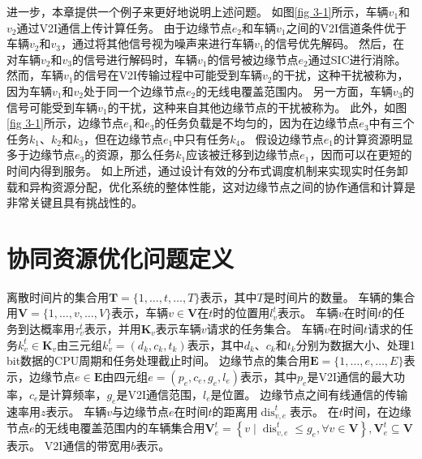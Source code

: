 进一步，本章提供一个例子来更好地说明上述问题。
如图\ref{fig 3-1}所示，车辆$v_1$和$v_2$通过V2I通信上传计算任务。
由于边缘节点$e_2$和车辆$v_1$之间的V2I信道条件优于车辆$v_2$和$v_3$，通过将其他信号视为噪声来进行车辆$v_1$的信号优先解码。
然后，在对车辆$v_2$和$v_3$的信号进行解码时，车辆$v_1$的信号被边缘节点$e_2$通过SIC进行消除。
然而，车辆$v_1$的信号在V2I传输过程中可能受到车辆$v_2$的干扰，这种干扰被称为，因为车辆$v_1$和$v_2$处于同一个边缘节点$e_2$的无线电覆盖范围内。
另一方面，车辆$v_3$的信号可能受到车辆$v_1$的干扰，这种来自其他边缘节点的干扰被称为。
此外，如图\ref{fig 3-1}所示，边缘节点$e_1$和$e_3$的任务负载是不均匀的，因为在边缘节点$e_3$中有三个任务$k_1$、$k_2$和$k_3$，但在边缘节点$e_1$中只有任务$k_4$。
假设边缘节点$e_1$的计算资源明显多于边缘节点$e_3$的资源，那么任务$k_1$应该被迁移到边缘节点$e_1$，因而可以在更短的时间内得到服务。
如上所述，通过设计有效的分布式调度机制来实现实时任务卸载和异构资源分配，优化系统的整体性能，这对边缘节点之间的协作通信和计算是非常关键且具有挑战性的。

\section[\hspace{-2pt}协同资源优化问题定义]{{ \hspace{-8pt}协同资源优化问题定义}}\label{section 3-3}

离散时间片的集合用$\mathbf{T}=\{1, \ldots, t, \ldots, T\}$表示，其中$T$是时间片的数量。
车辆的集合用$\mathbf{V}=\{1, \ldots, v, \ldots, V\}$表示，车辆$v \in \mathbf{V}$在$t$时的位置用$l_{v}^{t}$表示。
车辆$v$在时间$t$的任务到达概率用$\tau_{v}^{t}$表示，并用$\mathbf{K}_{v}$表示车辆$v$请求的任务集合。
车辆$v$在时间$t$请求的任务$k_{v}^{t} \in \mathbf{K}_{v}$由三元组$k_{v}^{t}=\left(d_{k}, c_{k}, t_{k}\right)$表示，其中$d_{k}$、$c_{k}$和$t_{k}$分别为数据大小、处理1 bit数据的CPU周期和任务处理截止时间。
边缘节点的集合用$\mathbf{E}=\{1, \ldots, e, \ldots, E\}$表示，边缘节点$e \in \mathbf{E}$由四元组$e=\left(p_{e}, c_{e}, g_{e}, l_{e}\right)$表示，其中$p_{e}$是V2I通信的最大功率，$c_{e}$是计算频率，$g_e$是V2I通信范围，$l_{e}$是位置。
边缘节点之间有线通信的传输速率用$z$表示。
车辆$v$与边缘节点$e$在时间$t$的距离用$\operatorname{dis}_{v, e}^{t}$表示。
在$t$时间，在边缘节点$e$的无线电覆盖范围内的车辆集合用$\mathbf{V}_{e}^{t}=\left\{v \mid \operatorname{dis}_{v, e}^{t} \leq g_{e}, \forall v \in \mathbf{V}\right\}, \mathbf{V}_{e}^{t} \subseteq \mathbf{V}$表示。
V2I通信的带宽用$b$表示。

